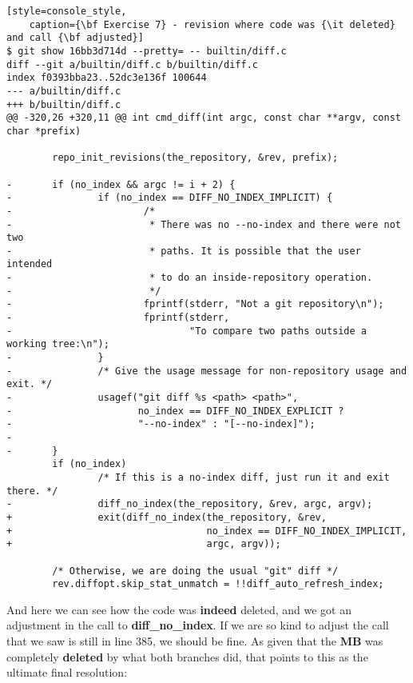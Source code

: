 \begin{lstlisting}[style=console_style,
	caption={\bf Exercise 7} - revision where code was {\it deleted} and call {\bf adjusted}]
$ git show 16bb3d714d --pretty= -- builtin/diff.c
diff --git a/builtin/diff.c b/builtin/diff.c
index f0393bba23..52dc3e136f 100644
--- a/builtin/diff.c
+++ b/builtin/diff.c
@@ -320,26 +320,11 @@ int cmd_diff(int argc, const char **argv, const char *prefix)
 
        repo_init_revisions(the_repository, &rev, prefix);
 
-       if (no_index && argc != i + 2) {
-               if (no_index == DIFF_NO_INDEX_IMPLICIT) {
-                       /*
-                        * There was no --no-index and there were not two
-                        * paths. It is possible that the user intended
-                        * to do an inside-repository operation.
-                        */
-                       fprintf(stderr, "Not a git repository\n");
-                       fprintf(stderr,
-                               "To compare two paths outside a working tree:\n");
-               }
-               /* Give the usage message for non-repository usage and exit. */
-               usagef("git diff %s <path> <path>",
-                      no_index == DIFF_NO_INDEX_EXPLICIT ?
-                      "--no-index" : "[--no-index]");
-
-       }
        if (no_index)
                /* If this is a no-index diff, just run it and exit there. */
-               diff_no_index(the_repository, &rev, argc, argv);
+               exit(diff_no_index(the_repository, &rev,
+                                  no_index == DIFF_NO_INDEX_IMPLICIT,
+                                  argc, argv));
 
        /* Otherwise, we are doing the usual "git" diff */
        rev.diffopt.skip_stat_unmatch = !!diff_auto_refresh_index;
\end{lstlisting}

And here we can see how the code was {\bf indeed} deleted, and we got an adjustment in the call to {\bf diff\_no\_index}.
If we are so kind to adjust the call that we saw is still in line 385, we should be fine. As given that the {\bf MB} was
completely {\bf deleted} by what both branches did, that points to this as the ultimate final resolution:


